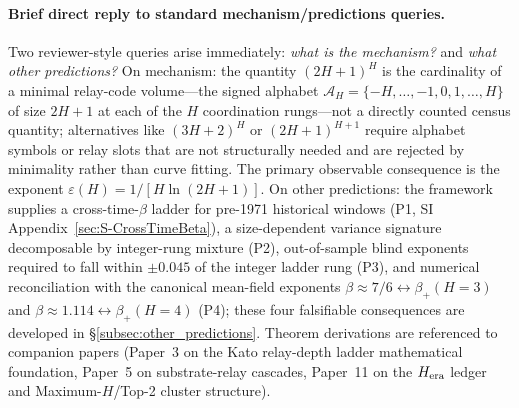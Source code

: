 \paragraph{Brief direct reply to standard mechanism/predictions queries.}
Two reviewer-style queries arise immediately: \emph{what is the mechanism?} and \emph{what other predictions?}
On mechanism: the quantity \((2H+1)^H\) is the cardinality of a minimal relay-code volume---the signed alphabet \(\mathcal{A}_H=\{-H,\dots,-1,0,1,\dots,H\}\) of size \(2H+1\) at each of the \(H\) coordination rungs---not a directly counted census quantity; alternatives like \((3H+2)^H\) or \((2H+1)^{H+1}\) require alphabet symbols or relay slots that are not structurally needed and are rejected by minimality rather than curve fitting. The primary observable consequence is the exponent \(\varepsilon(H)=1/[H\ln(2H+1)]\).
On other predictions: the framework supplies a cross-time-\(\beta\) ladder for pre-1971 historical windows (P1, SI Appendix~\ref{sec:S-CrossTimeBeta}), a size-dependent variance signature decomposable by integer-rung mixture (P2), out-of-sample blind exponents required to fall within \(\pm 0.045\) of the integer ladder rung (P3), and numerical reconciliation with the canonical mean-field exponents \(\beta\!\approx\!7/6\leftrightarrow\beta_+(H{=}3)\) and \(\beta\!\approx\!1.114\leftrightarrow\beta_+(H{=}4)\) (P4); these four falsifiable consequences are developed in \S\ref{subsec:other_predictions}. Theorem derivations are referenced to companion papers (Paper~3 on the Kato relay-depth ladder mathematical foundation, Paper~5 on substrate-relay cascades, Paper~11 on the \(H_{\rm era}\) ledger and Maximum-\(H\)/Top-2 cluster structure).

